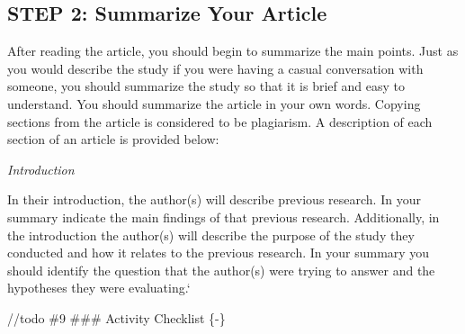 \documentclass[
]{book}
\begin{document}
\hypertarget{step-2-summarize-your-article}{%
\subsection*{STEP 2: Summarize Your Article}\label{step-2-summarize-your-article}}

After reading the article, you should begin to summarize the main points. Just as you would describe the study if you were having a casual conversation with someone, you should summarize the study so that it is brief and easy to understand. You should summarize the article in your own words. Copying sections from the article is considered to be plagiarism. A description of each section of an article is provided below:

\emph{Introduction}

In their introduction, the author(s) will describe previous research. In your summary indicate the main findings of that previous research. Additionally, in the introduction the author(s) will describe the purpose of the study they conducted and how it relates to the previous research. In your summary you should identify the question that the author(s) were trying to answer and the hypotheses they were evaluating.`

//todo \#9
\#\#\# Activity Checklist \{-\}
\end{document}
